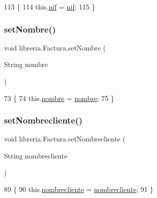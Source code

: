 \begin{DoxyCode}
113                                    \{
114         this.\mbox{\hyperlink{classlibreria_1_1_factura_a13e68de98d752d7226ca9107446075ec}{nif}} = \mbox{\hyperlink{classlibreria_1_1_factura_a13e68de98d752d7226ca9107446075ec}{nif}};
115     \}
\end{DoxyCode}
\mbox{\label{classlibreria_1_1_factura_a1593e1be1d82b76a3ad751efbfc82cab}} 
\subsubsection{\texorpdfstring{set\+Nombre()}{setNombre()}}
{\footnotesize\ttfamily void libreria.\+Factura.\+set\+Nombre (\begin{DoxyParamCaption}\item[{String}]{nombre }\end{DoxyParamCaption})\hspace{0.3cm}{\ttfamily [inline]}}


\begin{DoxyCode}
73                                          \{
74         this.\mbox{\hyperlink{classlibreria_1_1_factura_acd12a84d167767add71cac38d219088f}{nombre}} = \mbox{\hyperlink{classlibreria_1_1_factura_acd12a84d167767add71cac38d219088f}{nombre}};
75     \}
\end{DoxyCode}
\mbox{\label{classlibreria_1_1_factura_a62c6a5c605af26f453bbdc5d7dfeb430}} 
\subsubsection{\texorpdfstring{set\+Nombrecliente()}{setNombrecliente()}}
{\footnotesize\ttfamily void libreria.\+Factura.\+set\+Nombrecliente (\begin{DoxyParamCaption}\item[{String}]{nombrecliente }\end{DoxyParamCaption})\hspace{0.3cm}{\ttfamily [inline]}}


\begin{DoxyCode}
89                                                        \{
90         this.\mbox{\hyperlink{classlibreria_1_1_factura_a6a9dc56e42e06f7928de4c51bff30443}{nombrecliente}} = \mbox{\hyperlink{classlibreria_1_1_factura_a6a9dc56e42e06f7928de4c51bff30443}{nombrecliente}};
91     \}
\end{DoxyCode}
\mbox{\label{classlibreria_1_1_factura_aa4fe695e4460b4268f1e09254bd7f1b5}} 
